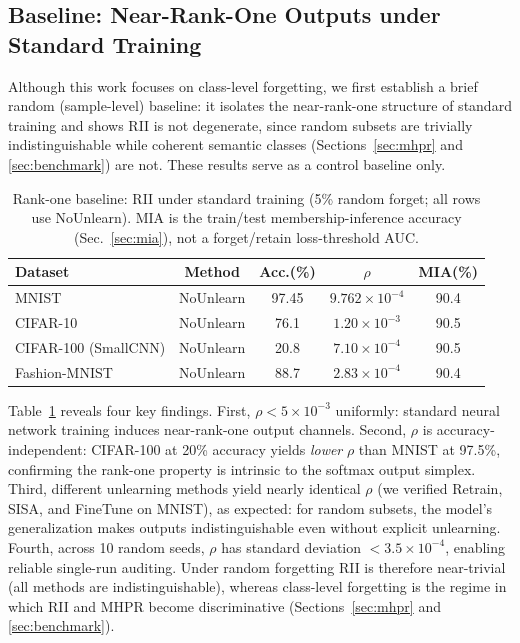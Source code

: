 \documentclass[smallextended]{svjour3}       %
\begin{document}
\subsection{Baseline: Near-Rank-One Outputs under Standard Training}

Although this work focuses on class-level forgetting, we first establish a brief random (sample-level) baseline: it isolates the near-rank-one structure of standard training and shows RII is not degenerate, since random subsets are trivially indistinguishable while coherent semantic classes (Sections~\ref{sec:mhpr} and \ref{sec:benchmark}) are not. These results serve as a control baseline only.

\begin{table}[t]
\centering
\small
\caption{Rank-one baseline: RII under standard training (5\% random forget; all rows use NoUnlearn). MIA is the train/test membership-inference accuracy (Sec.~\ref{sec:mia}), not a forget/retain loss-threshold AUC.}\label{tab:main}
\setlength{\tabcolsep}{2pt}
\begin{tabular}{l c c c c}
\toprule
Dataset & Method & Acc.(\%) & $\rho$ & MIA(\%) \\
\midrule
MNIST & NoUnlearn & 97.45 & $9.762\times10^{-4}$ & 90.4 \\
CIFAR-10 & NoUnlearn & 76.1 & $1.20\times10^{-3}$ & 90.5 \\
CIFAR-100 (SmallCNN) & NoUnlearn & 20.8 & $7.10\times10^{-4}$ & 90.5 \\
Fashion-MNIST & NoUnlearn & 88.7 & $2.83\times10^{-4}$ & 90.4 \\
\bottomrule
\end{tabular}
\end{table}

Table~\ref{tab:main} reveals four key findings. First, $\rho<5\times10^{-3}$ uniformly: standard neural network training induces near-rank-one output channels. Second, $\rho$ is accuracy-independent: CIFAR-100 at 20\% accuracy yields \emph{lower} $\rho$ than MNIST at 97.5\%, confirming the rank-one property is intrinsic to the softmax output simplex. Third, different unlearning methods yield nearly identical $\rho$ (we verified Retrain, SISA, and FineTune on MNIST), as expected: for random subsets, the model's generalization makes outputs indistinguishable even without explicit unlearning. Fourth, across 10 random seeds, $\rho$ has standard deviation $<3.5\times10^{-4}$, enabling reliable single-run auditing. Under random forgetting RII is therefore near-trivial (all methods are indistinguishable), whereas class-level forgetting is the regime in which RII and MHPR become discriminative (Sections~\ref{sec:mhpr} and \ref{sec:benchmark}).
\end{document}
